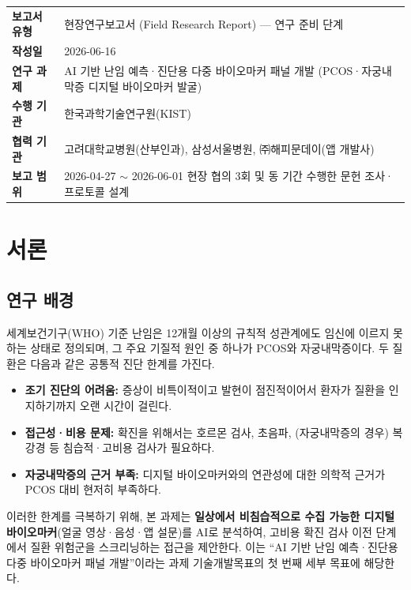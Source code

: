 \documentclass[11pt,a4paper]{article}
\begin{document}
\begin{table}[h]
\centering
\footnotesize
\renewcommand{\arraystretch}{1.25}
\begin{tabularx}{\textwidth}{@{}>{\bfseries}p{2.4cm} L@{}}
\toprule
보고서 유형 & 현장연구보고서 (Field Research Report) --- 연구 준비 단계 \\
작성일 & 2026-06-16 \\
연구 과제 & AI 기반 난임 예측·진단용 다중 바이오마커 패널 개발 (PCOS·자궁내막증 디지털 바이오마커 발굴) \\
수행 기관 & 한국과학기술연구원(KIST) \\
협력 기관 & 고려대학교병원(산부인과), 삼성서울병원, ㈜해피문데이(앱 개발사) \\
보고 범위 & 2026-04-27 $\sim$ 2026-06-01 현장 협의 3회 및 동 기간 수행한 문헌 조사·프로토콜 설계 \\
\bottomrule
\end{tabularx}
\end{table}

\clearpage

\section{서론}

\subsection{연구 배경}
세계보건기구(WHO) 기준 난임은 12개월 이상의 규칙적 성관계에도 임신에 이르지 못하는 상태로 정의되며, 그 주요 기질적 원인 중 하나가 PCOS와 자궁내막증이다. 두 질환은 다음과 같은 공통적 진단 한계를 가진다.

\begin{itemize}
  \item \textbf{조기 진단의 어려움:} 증상이 비특이적이고 발현이 점진적이어서 환자가 질환을 인지하기까지 오랜 시간이 걸린다.
  \item \textbf{접근성·비용 문제:} 확진을 위해서는 호르몬 검사, 초음파, (자궁내막증의 경우) 복강경 등 침습적·고비용 검사가 필요하다.
  \item \textbf{자궁내막증의 근거 부족:} 디지털 바이오마커와의 연관성에 대한 의학적 근거가 PCOS 대비 현저히 부족하다.
\end{itemize}

이러한 한계를 극복하기 위해, 본 과제는 \textbf{일상에서 비침습적으로 수집 가능한 디지털 바이오마커}(얼굴 영상·음성·앱 설문)를 AI로 분석하여, 고비용 확진 검사 이전 단계에서 질환 위험군을 스크리닝하는 접근을 제안한다. 이는 ``AI 기반 난임 예측·진단용 다중 바이오마커 패널 개발''이라는 과제 기술개발목표의 첫 번째 세부 목표에 해당한다.
\end{document}

